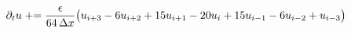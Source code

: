 \documentclass[preview]{standalone}
\begin{document}
\begin{align*}
\special{dvisvgm:raw <g id='unique000'>}\partial_t u \mathrel{+}= \frac{\epsilon}{64\,\Delta x}\big(u_{i+3}-6u_{i+2}+15u_{i+1}-20u_i+15u_{i-1}-6u_{i-2}+u_{i-3}\big)\special{dvisvgm:raw </g>}
\end{align*}
\end{document}
